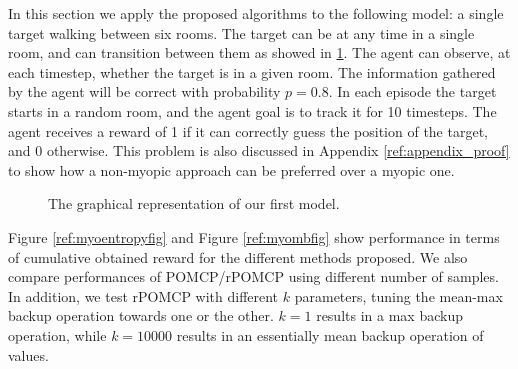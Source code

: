 In this section we apply the proposed algorithms to the following model: a single target walking
between six rooms. The target can be at any time in a single room, and can transition between them
as showed in \ref{ref:nonmyo1}. The agent can observe, at each timestep, whether the target is in a
given room. The information gathered by the agent will be correct with probability $p=0.8$. In each
episode the target starts in a random room, and the agent goal is to track it for 10 timesteps. The
agent receives a reward of 1 if it can correctly guess the position of the target, and 0 otherwise.
This problem is also discussed in Appendix \ref{ref:appendix_proof} to show how a non-myopic
approach can be preferred over a myopic one.

\begin{figure}[ht]
\centering
{}
\caption{The graphical representation of our first model.}
\label{ref:nonmyo1}
\end{figure}

Figure \ref{ref:myoentropyfig} and Figure \ref{ref:myombfig} show performance in terms of cumulative
obtained reward for the different methods proposed. We also compare performances of POMCP/rPOMCP
using different number of samples. In addition, we test rPOMCP with different $k$ parameters, tuning
the mean-max backup operation towards one or the other. $k = 1$ results in a max backup
operation, while $k = 10000$ results in an essentially mean backup operation of values.

